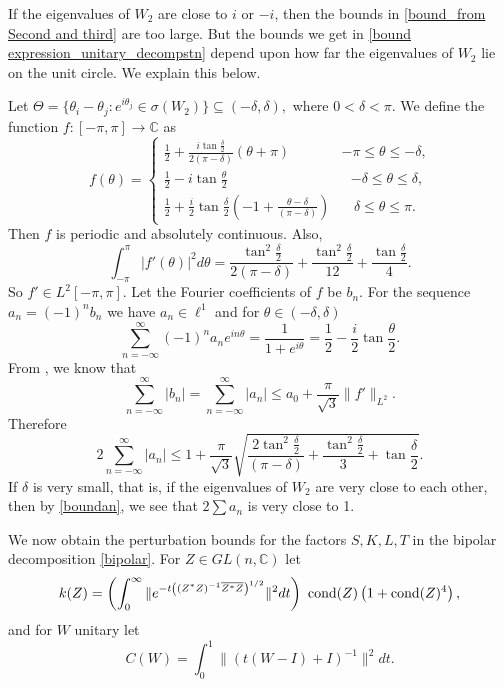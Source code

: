\documentclass[12pt,epsfig,reqno]{amsart}
\theoremstyle{remark}
\begin{document}
If the eigenvalues of $W_2$ are close to $i$ or $ -i$, then the bounds in \eqref{bound_from Second and third} are too large. But the bounds we get in \eqref{bound expression_unitary_decompstn} depend upon how far the eigenvalues of $W_2$ lie on the unit circle. We explain this below.

Let $\Theta= \{\theta_i-\theta_j: e^{i\theta_j}\in \sigma(W_2)\}\subseteq (-\delta, \delta),$ where $0<\delta<\pi$.  We define the function $f: [-\pi, \pi]\to \mathbb C$ as
\[
  f(\theta) =
  \begin{cases}
    \frac{1}{2}+ \frac{i\tan\frac{\delta}{2}}{2(\pi-\delta)}(\theta+\pi) & \text{$-\pi\leq \theta \leq -\delta$,} \\
    \frac{1}{2}-i\tan\frac{\theta}{2}& \text{ $-\delta\leq \theta\leq \delta$,}\\
    \frac{1}{2}+\frac{i}{2}\tan\frac{\delta}{2}(-1+\frac{\theta-\delta}{(\pi-\delta)})&\text{ $\ \delta\leq \theta\leq \pi$.}
  \end{cases}
\]
Then $f$ is periodic and absolutely continuous. Also, $$\int_{-\pi}^{\pi}|f'(\theta)|^2d\theta = \frac{\tan^2\frac{\delta}{2}}{2(\pi- \delta)}+\frac{\tan^2\frac{\delta}{2}}{12}+\frac{\tan\frac{\delta}{2}}{4}.$$ So $f'\in L^2[-\pi, \pi]$.
Let the Fourier coefficients of $f$ be $b_n$.  For the sequence $a_n=(-1)^n b_n$ we have $a_n\in \ell^1$ and for $\theta\in (-\delta, \delta)$
 \begin{equation}
\sum_{n=-\infty}^\infty (-1)^n a_n e^{in\theta}= \frac{1}{1+e^{i\theta}}= \frac{1}{2}-\frac{i}{2}\tan\frac{\theta}{2}.
\end{equation}
From \cite[p. 117]{bhatia_fs}, we know that $$\sum_{n=-\infty}^{\infty}|b_n|= \sum_{n=-\infty}^{\infty}|a_n| \leq a_0+ \frac{\pi}{\sqrt{3}}\|f'\|_{L^2}.$$
Therefore \begin{equation}\label{boundan}2\sum_{n=-\infty}^{\infty} |a_n|\leq 1+ \frac{\pi}{\sqrt{3}}\sqrt{\frac{2\tan^2\frac{\delta}{2}}{(\pi- \delta)}+\frac{\tan^2\frac{\delta}{2}}{3}+\tan\frac{\delta}{2}}.\end{equation}
If $\delta$ is very small, that is, if the eigenvalues of $W_2$ are very close to each other, then by \eqref{boundan}, we see that  $2\sum a_n$ is very close to 1.

We now obtain the perturbation bounds for the factors $S,K, L, T$ in the bipolar decomposition \eqref{bipolar}.
 For $Z\in GL(n,\mathbb C)$ let $$k(Z)=\left(\int_0^\infty \|e^{-t\left( (Z^* Z)^{-1} \overline{Z^* Z}\right)^{1/2}}\|^2 dt\right)\
\text{\rm cond} (Z)  \left(1+\text{\rm cond}(Z)^4\right),$$ and for $W$ unitary let $$C(W)=\int_0^1\|(t(W-I)+I)^{-1}\|^2dt.$$
\end{document}
